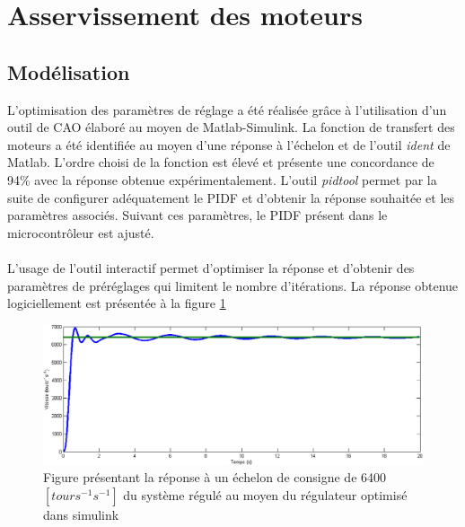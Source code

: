 \section{Asservissement des moteurs}
\subsection{Modélisation}
L'optimisation des paramètres de réglage a été réalisée grâce à l'utilisation d'un outil de CAO élaboré au moyen de Matlab-Simulink. La fonction de transfert des moteurs a été identifiée au moyen d'une réponse à l'échelon et de l'outil \textit{ident} de Matlab. L'ordre choisi de la fonction est élevé et présente une concordance de 94\% avec la réponse obtenue expérimentalement. L'outil \textit{pidtool} permet par la suite de configurer adéquatement le PIDF et d'obtenir la réponse souhaitée et les paramètres associés. Suivant ces paramètres, le PIDF présent dans le microcontrôleur est ajusté.
\paragraph{}L'usage de l'outil interactif permet d'optimiser la réponse et d'obtenir des paramètres de préréglages qui limitent le nombre d'itérations. La réponse obtenue logiciellement est présentée à la figure \ref{fig:as_1}
\begin{figure}[htbp]
\centering
\includegraphics[scale=0.6]{fig/asservissement_1.png}
\caption{Figure présentant la réponse à un échelon de consigne de 6400$\left[tours^{-1}s^{-1}\right]$ du système régulé au moyen du régulateur optimisé dans simulink}
\label{fig:as_1}
\end{figure}
